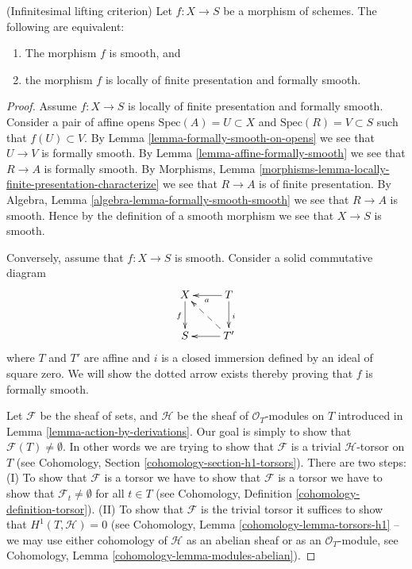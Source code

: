 \begin{lemma}
\label{lemma-smooth-formally-smooth}
(Infinitesimal lifting criterion)
Let $f : X \to S$ be a morphism of schemes.
The following are equivalent:
\begin{enumerate}
\item The morphism $f$ is smooth, and
\item the morphism $f$ is locally of finite presentation and
formally smooth.
\end{enumerate}
\end{lemma}

\begin{proof}
Assume $f : X \to S$ is locally of finite presentation and formally smooth.
Consider a pair of affine opens $\text{Spec}(A) = U \subset X$ and
$\text{Spec}(R) = V \subset S$
such that $f(U) \subset V$. By Lemma \ref{lemma-formally-smooth-on-opens}
we see that $U \to V$ is formally smooth. By Lemma
\ref{lemma-affine-formally-smooth} we see that $R \to A$ is formally
smooth. By
Morphisms, Lemma \ref{morphisms-lemma-locally-finite-presentation-characterize}
we see that $R \to A$ is of finite presentation.
By Algebra, Lemma \ref{algebra-lemma-formally-smooth-smooth}
we see that $R \to A$ is smooth.
Hence by the definition of a smooth morphism we see that $X \to S$ is smooth.

\medskip\noindent
Conversely, assume that $f : X \to S$ is smooth. Consider a solid commutative
diagram
$$
\xymatrix{
X \ar[d]_f & T \ar[d]^i \ar[l]^a \\
S & T' \ar[l] \ar@{-->}[lu]
}
$$
where $T$ and $T'$ are affine and $i$ is a closed immersion defined
by an ideal of square zero. We will show the dotted arrow exists thereby
proving that $f$ is formally smooth.

\medskip\noindent
Let $\mathcal{F}$ be the sheaf of sets, and $\mathcal{H}$ be the sheaf
of $\mathcal{O}_T$-modules on $T$ introduced
in Lemma \ref{lemma-action-by-derivations}. Our goal is simply
to show that $\mathcal{F}(T) \not = \emptyset$. In other words we
are trying to show that $\mathcal{F}$ is a trivial $\mathcal{H}$-torsor
on $T$ (see Cohomology, Section \ref{cohomology-section-h1-torsors}).
There are two steps: (I) To show that $\mathcal{F}$ is a torsor
we have to show that $\mathcal{F}$ is a torsor we have to show
that $\mathcal{F}_t \not = \emptyset$ for all $t \in T$ (see
Cohomology, Definition \ref{cohomology-definition-torsor}).
(II) To show that $\mathcal{F}$ is the trivial torsor it suffices
to show that $H^1(T, \mathcal{H}) = 0$ (see
Cohomology, Lemma \ref{cohomology-lemma-torsors-h1} --
we may use either cohomology
of $\mathcal{H}$ as an abelian sheaf or as an $\mathcal{O}_T$-module,
see Cohomology, Lemma \ref{cohomology-lemma-modules-abelian}).


\end{proof}
